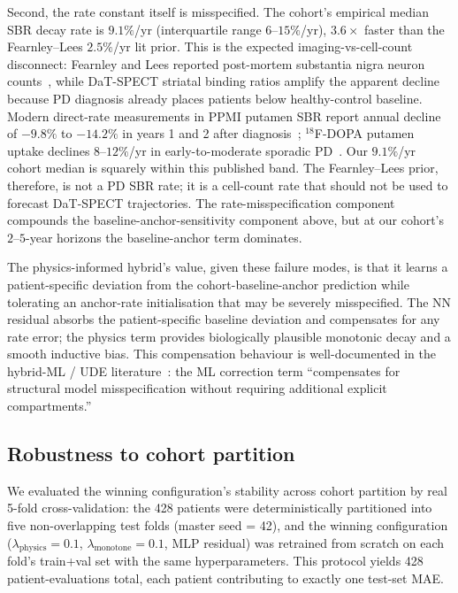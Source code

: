 Second, the rate constant itself is misspecified. The cohort's empirical median SBR decay rate is $9.1\%$/yr (interquartile range $6$--$15\%$/yr), $3.6\times$ faster than the Fearnley--Lees $2.5\%$/yr lit prior. This is the expected imaging-vs-cell-count disconnect: Fearnley and Lees reported post-mortem substantia nigra neuron counts~\cite{fearnleyLees1991}, while DaT-SPECT striatal binding ratios amplify the apparent decline because PD diagnosis already places patients below healthy-control baseline. Modern direct-rate measurements in PPMI putamen SBR report annual decline of $-9.8\%$ to $-14.2\%$ in years 1 and 2 after diagnosis~\cite{marek2015ppmi}; $^{18}$F-DOPA putamen uptake declines $8$--$12\%$/yr in early-to-moderate sporadic PD~\cite{nandhagopal2009brain}. Our $9.1\%$/yr cohort median is squarely within this published band. The Fearnley--Lees prior, therefore, is not a PD SBR rate; it is a cell-count rate that should not be used to forecast DaT-SPECT trajectories. The rate-misspecification component compounds the baseline-anchor-sensitivity component above, but at our cohort's $2$--$5$-year horizons the baseline-anchor term dominates.

The physics-informed hybrid's value, given these failure modes, is that it learns a patient-specific deviation from the cohort-baseline-anchor prediction while tolerating an anchor-rate initialisation that may be severely misspecified. The NN residual absorbs the patient-specific baseline deviation and compensates for any rate error; the physics term provides biologically plausible monotonic decay and a smooth inductive bias. This compensation behaviour is well-documented in the hybrid-ML / UDE literature~\cite{philipps2025universal,karniadakis2021pinn}: the ML correction term ``compensates for structural model misspecification without requiring additional explicit compartments.''

\subsection{Robustness to cohort partition}\label{sec:robustness}

We evaluated the winning configuration's stability across cohort partition by real 5-fold cross-validation: the 428 patients were deterministically partitioned into five non-overlapping test folds (master seed = 42), and the winning configuration ($\lambda_\text{physics} = 0.1$, $\lambda_\text{monotone} = 0.1$, MLP residual) was retrained from scratch on each fold's train+val set with the same hyperparameters. This protocol yields 428 patient-evaluations total, each patient contributing to exactly one test-set MAE.

